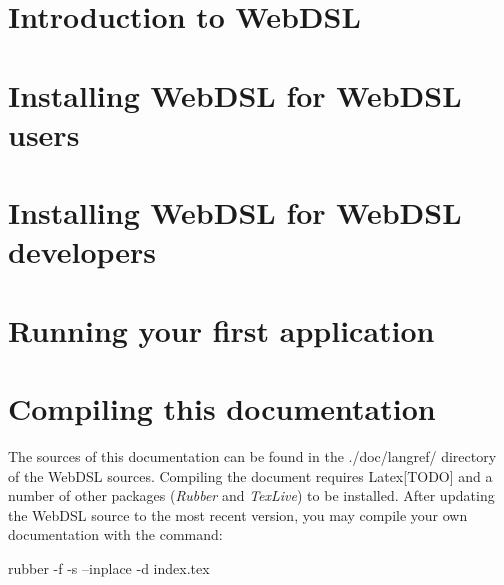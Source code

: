 \chapter{Introduction to WebDSL}


\chapter{Installing WebDSL for WebDSL users}\label{installuser}


\chapter{Installing WebDSL for WebDSL developers}


\chapter{Running your first application }\label{firstapp}


\chapter{Compiling this documentation}
The sources of this documentation can be found in the ./doc/langref/ directory of the WebDSL sources. Compiling the document requires Latex[TODO] and a number of other packages (\emph{Rubber} and \emph{TexLive}) to be installed. After updating the WebDSL source to the most recent version, you may compile your own documentation with the command:
\begin{shell}
rubber -f -s --inplace -d index.tex
\end{shell}
